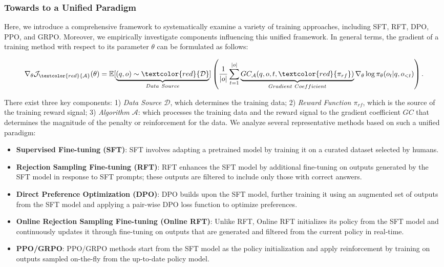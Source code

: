 \begin{itemize}[topsep=0pt]
\begin{itemize}[topsep=0pt]
\subsubsection{Towards to a Unified Paradigm} Here, we introduce a comprehensive framework to systematically examine a variety of training approaches, including SFT, RFT, DPO, PPO, and GRPO. Moreover, we empirically investigate components influencing this unified framework. In general terms, the gradient of a training method with respect to its parameter $\theta$ can be formulated as follows:

\begin{equation}
    \nabla_{\theta}\mathcal{J}_{\textcolor{red}{\mathcal{A}}}(\theta) = \mathbb{E}[\underbrace{(q,o) \sim \textcolor{red}{\mathcal{D}}}_{Data \ Source}]\left( \frac{1}{|o|} \sum_{t=1}^{|o|}  \underbrace{GC_{{\mathcal{A}}}(q, o, t, \textcolor{red}{\pi_{{rf}}})}_{Gradient \ Coefficient}  \nabla_{\theta}\log \pi_{\theta}(o_t | q, o_{<t})\right).
\label{eq:objective}
\end{equation}

There exist three key components: 1) \textit{Data Source $\mathcal{D}$}, which determines the training data; 2) \textit{Reward Function $\pi_{{rf}}$}, which is the source of the training reward signal; 3) \textit{Algorithm $\mathcal{A}$}: which processes the training data and the reward signal to the gradient coefficient $GC$ that determines the magnitude of the penalty or reinforcement for the data. We analyze several representative methods based on such a unified paradigm:

\begin{itemize}
    \item \textbf{Supervised Fine-tuning (SFT)}: SFT involves adapting a pretrained model by training it on a curated dataset selected by humans.
    \item \textbf{Rejection Sampling Fine-tuning (RFT)}: RFT enhances the SFT model by additional fine-tuning on outputs generated by the SFT model in response to SFT prompts; these outputs are filtered to include only those with correct answers.
    \item \textbf{Direct Preference Optimization (DPO)}: DPO builds upon the SFT model, further training it using an augmented set of outputs from the SFT model and applying a pair-wise DPO loss function to optimize preferences.
    \item \textbf{Online Rejection Sampling Fine-tuning (Online RFT)}: Unlike RFT, Online RFT initializes its policy from the SFT model and continuously updates it through fine-tuning on outputs that are generated and filtered from the current policy in real-time.
    \item \textbf{PPO/GRPO}: PPO/GRPO methods start from the SFT model as the policy initialization and apply reinforcement by training on outputs sampled on-the-fly from the up-to-date policy model.
\end{itemize}


\end{itemize}
\end{itemize}
